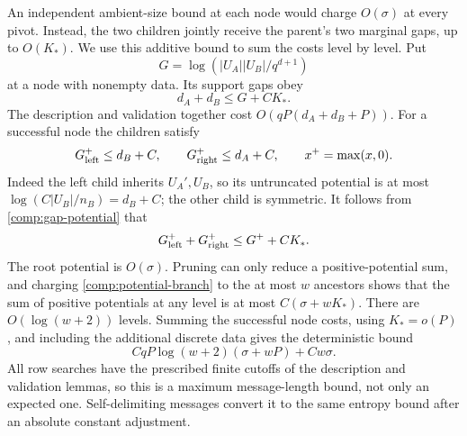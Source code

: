 An independent ambient-size bound at each node would charge
\(O(\sigma)\) at every pivot. Instead, the two children
jointly receive the parent's two marginal gaps, up to
\(O(K_*)\). We use this additive bound to sum the costs
level by level. Put
\[
 G=\log(|U_A||U_B|/q^{d+1})
\]
at a node with nonempty data. Its support gaps obey
\begin{equation}\label{comp:gap-potential}
 d_A+d_B\le G+CK_*.
\end{equation}
The description and validation together cost
\(O(qP(d_A+d_B+P))\).
For a successful node the children satisfy
\[
 G_{\rm left}^+\le d_B+C,\qquad
 G_{\rm right}^+\le d_A+C,
 \qquad x^+=\max(x,0).
\]
Indeed the left child inherits \(U_A',U_B\), so its
untruncated potential is at most
\(\log(C|U_B|/n_B)=d_B+C\); the other child is symmetric.
It follows from \eqref{comp:gap-potential} that
\begin{equation}\label{comp:potential-branch}
 G_{\rm left}^++G_{\rm right}^+
       \le G^++CK_*.
\end{equation}
The root potential is \(O(\sigma)\).
Pruning can only reduce a positive-potential sum, and
charging \eqref{comp:potential-branch} to the at most
\(w\) ancestors shows that the sum of positive
potentials at any level is at most
\(C(\sigma+wK_*)\).
There are \(O(\log(w+2))\) levels. Summing the successful
node costs, using \(K_*=o(P)\), and including the
additional discrete data gives the deterministic bound
\begin{equation}\label{comp:tree-cost}
 CqP\log(w+2)(\sigma+wP)+Cw\sigma.
\end{equation}
All row searches have the prescribed finite cutoffs of
the description and validation lemmas, so this is a
maximum message-length bound, not only an expected one.
Self-delimiting messages convert it to the same entropy
bound after an absolute constant adjustment.

